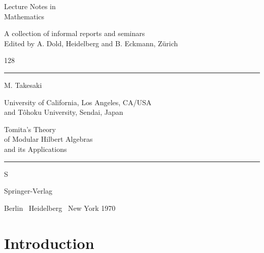 \documentclass[12pt,b5paper,twoside]{article}
\theoremstyle{takesaki}
\numberwithin{equation}{section}
\begin{document}
\setcounter{page}{1}
\begin{titlepage}
\thispagestyle{empty}
\newcommand{\coverblock}[1]{%
  \noindent\hspace*{0.245\textwidth}%
  \begin{minipage}{0.73\textwidth}\raggedright#1\end{minipage}\par}
\coverblock{{\Huge Lecture Notes in\\[0.2em]Mathematics\par}}
\vspace{1.2em}
\coverblock{{\normalsize A collection of informal reports and seminars\\
Edited by A. Dold, Heidelberg and B. Eckmann, Z\"urich\par}}
\vfill
\coverblock{{\Huge 128\par}}
\vspace{1.5em}
\noindent\rule{\textwidth}{0.6pt}\par
\vspace{1.2em}
\coverblock{{\LARGE M. Takesaki\par}\vspace{0.5em}
{\normalsize University of California, Los Angeles, CA/USA\\
and T\^ohoku University, Sendai, Japan\par}}
\vfill
\coverblock{{\LARGE Tomita's Theory\\
of Modular Hilbert Algebras\\
and its Applications\par}}
\vspace{1.2em}
\noindent\rule{\textwidth}{0.6pt}\par
\vfill
\coverblock{{\Large\textcircled{\scriptsize S}\par}\vspace{0.8em}
{\LARGE Springer-Verlag\par}\vspace{0.4em}
{\normalsize Berlin \textperiodcentered\ Heidelberg \textperiodcentered\ New York 1970\par}}
\end{titlepage}

\section*{Introduction}\label{sec:introduction}
\end{document}
